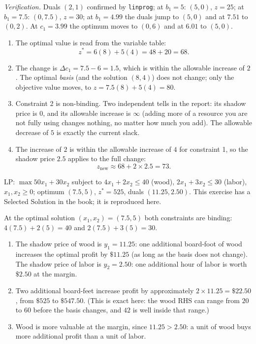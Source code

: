 \emph{Verification.} Duals $(2,1)$ confirmed by \texttt{linprog}; at $b_1 = 5$: $(5,0)$, $z = 25$; at $b_1 = 7.5$: $(0, 7.5)$, $z = 30$; at $b_1 = 4.99$ the duals jump to $(5,0)$ and at $7.51$ to $(0,2)$. At $c_1 = 3.99$ the optimum moves to $(0,6)$ and at $6.01$ to $(5,0)$.


\begin{enumerate}
\item The optimal value is read from the variable table:
\[
z^* = 6(8) + 5(4) = 48 + 20 = 68 .
\]
\item The change is $\Delta c_1 = 7.5 - 6 = 1.5$, which is within the allowable increase of $2$. The optimal \emph{basis} (and the solution $(8,4)$) does not change; only the objective value moves, to $z = 7.5(8) + 5(4) = 80$.
\item Constraint 2 is non-binding. Two independent tells in the report: its shadow price is $0$, and its allowable increase is $\infty$ (adding more of a resource you are not fully using changes nothing, no matter how much you add). The allowable decrease of $5$ is exactly the current slack.
\item The increase of $2$ is within the allowable increase of $4$ for constraint 1, so the shadow price $2.5$ applies to the full change:
\[
z_{\text{new}} \approx 68 + 2 \times 2.5 = 73 .
\]
\end{enumerate}


LP: $\max 50x_1 + 30x_2$ subject to $4x_1 + 2x_2 \le 40$ (wood), $2x_1 + 3x_2 \le 30$ (labor), $x_1, x_2 \ge 0$; optimum $(7.5, 5)$, $z^* = 525$, duals $(11.25, 2.50)$. This exercise has a Selected Solution in the book; it is reproduced here.

At the optimal solution $(x_1, x_2) = (7.5, 5)$ both constraints are binding: $4(7.5) + 2(5) = 40$ and $2(7.5) + 3(5) = 30$.

\begin{enumerate}
\item The shadow price of wood is $y_1 = 11.25$: one additional board-foot of wood increases the optimal profit by $\$11.25$ (as long as the basis does not change). The shadow price of labor is $y_2 = 2.50$: one additional hour of labor is worth $\$2.50$ at the margin.
\item Two additional board-feet increase profit by approximately $2 \times 11.25 = \$22.50$, from $\$525$ to $\$547.50$. (This is exact here: the wood RHS can range from $20$ to $60$ before the basis changes, and $42$ is well inside that range.)
\item Wood is more valuable at the margin, since $11.25 > 2.50$: a unit of wood buys more additional profit than a unit of labor.
\end{enumerate}

